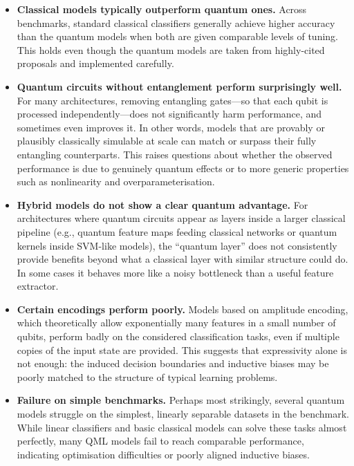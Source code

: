 \begin{itemize}
  \item \textbf{Classical models typically outperform quantum ones.}  
  Across benchmarks, standard classical classifiers generally achieve higher accuracy than the quantum models when both are given comparable levels of tuning. This holds even though the quantum models are taken from highly-cited proposals and implemented carefully.
  
  \item \textbf{Quantum circuits without entanglement perform surprisingly well.}  
  For many architectures, removing entangling gates---so that each qubit is processed independently---does not significantly harm performance, and sometimes even improves it. In other words, models that are provably or plausibly classically simulable at scale can match or surpass their fully entangling counterparts. This raises questions about whether the observed performance is due to genuinely quantum effects or to more generic properties such as nonlinearity and overparameterisation.
  
  \item \textbf{Hybrid models do not show a clear quantum advantage.}  
  For architectures where quantum circuits appear as layers inside a larger classical pipeline (e.g., quantum feature maps feeding classical networks or quantum kernels inside SVM-like models), the ``quantum layer'' does not consistently provide benefits beyond what a classical layer with similar structure could do. In some cases it behaves more like a noisy bottleneck than a useful feature extractor.
  
  \item \textbf{Certain encodings perform poorly.}  
  Models based on amplitude encoding, which theoretically allow exponentially many features in a small number of qubits, perform badly on the considered classification tasks, even if multiple copies of the input state are provided. This suggests that expressivity alone is not enough: the induced decision boundaries and inductive biases may be poorly matched to the structure of typical learning problems.
  
  \item \textbf{Failure on simple benchmarks.}  
  Perhaps most strikingly, several quantum models struggle on the simplest, linearly separable datasets in the benchmark. While linear classifiers and basic classical models can solve these tasks almost perfectly, many QML models fail to reach comparable performance, indicating optimisation difficulties or poorly aligned inductive biases.
\end{itemize}

